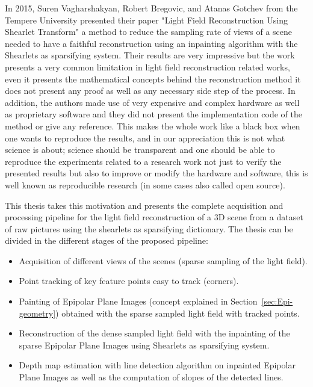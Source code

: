 In 2015, Suren Vagharshakyan, Robert Bregovic, and Atanas Gotchev from the Tempere University presented their paper "Light Field Reconstruction Using Shearlet Transform"\cite{LF-Shearlets} a method to reduce the sampling rate of views of a scene needed to have a faithful reconstruction using an inpainting algorithm with the Shearlets as sparsifying system. Their results are very impressive but the work presents a very common limitation in light field reconstruction related works, even it presents the mathematical concepts behind the reconstruction method it does not present any proof as well as any necessary side step of the process. In addition, the authors made use of very expensive and complex hardware as well as proprietary software and they did not present the implementation code of the method or give any reference. This makes the whole work like a black box when one wants to reproduce the results, and in our appreciation this is not what science is about; science should be transparent and one should be able to reproduce the experiments related to a research work not just to verify the presented results but also to improve or modify the hardware and software, this is well known as reproducible research (in some cases also called open source). 

\bigskip

This thesis takes this motivation and presents the complete acquisition and processing pipeline for the light field reconstruction of a 3D scene from a dataset of raw pictures using the shearlets as sparsifying dictionary. The thesis can be divided in the different stages of the proposed pipeline:

\begin{itemize}
\item Acquisition of different views of the scenes (sparse sampling of the light field).
\item Point tracking of key feature points easy to track (corners).
\item Painting of Epipolar Plane Images (concept explained in Section~\ref{sec:Epi-geometry}) obtained with the sparse sampled light field with tracked points.
\item Reconstruction of the dense sampled light field with the inpainting of the sparse Epipolar Plane Images using Shearlets as sparsifying system. 
\item Depth map estimation with line detection algorithm on inpainted Epipolar Plane Images as well as the computation of slopes of the detected lines.
\end{itemize}

